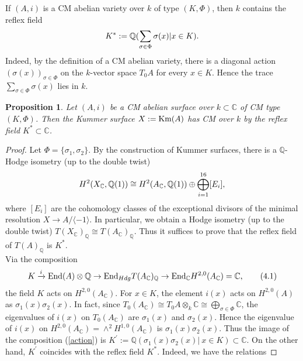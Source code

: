 \documentclass[reqno,a4paper,11pt]{amsart}
\newtheorem{prop}[dfn]{Proposition}
\theoremstyle{definition}
\theoremstyle{definition}
\begin{document}
      If $(A, i)$ is a CM abelian variety over $k$ of type $(K, \Phi)$, then $k$ contains the reflex field 
      \begin{align}\notag K^{\ast}:=\mathbb{Q}(\sum_{\sigma\in \Phi}\sigma(x)| x\in K).
      \end{align}Indeed, by the definition of a CM abelian variety, there is a diagonal action $(\sigma(x))_{\sigma\in \Phi}$ on the $k$-vector space $T_{0}A$ for every $x\in K$. Hence the trace $\sum_{\sigma\in \Phi}\sigma(x)$ lies in $k$.    
      \begin{prop}
          Let $(A, i)$ be a CM abelian surface over $k\subset \mathbb{C}$ of CM type $(K, \Phi)$. Then the Kummer surface $X:={\rm Km}(A)$ has CM over $k$ by the reflex field $K^{\ast}\subset\mathbb{C}$. 
      \end{prop} 
      \begin{proof}Let $\Phi=\{\sigma_{1}, \sigma_{2}\}.$ By the construction of Kummer surfaces, there is a $\mathbb{Q}$-Hodge isometry (up to the double twist)
          \begin{align}
              H^{2}(X_{\mathbb{C}}, \mathbb{Q}(1))\cong H^{2}(A_{\mathbb{C}}, \mathbb{Q}(1))\oplus \bigoplus^{16}_{i=1}[E_{i}], \notag 
          \end{align}
          where $[E_{i}]$ are the cohomology classes of the exceptional divisors of the minimal resolution $X\to A/\langle-1\rangle$.
          In particular, we obtain a Hodge isometry (up to the double twist) $T(X_\mathbb{C})_{\mathbb{Q}}\cong T(A_{\mathbb{C}})_{\mathbb{Q}}$.  Thus it  suffices to prove that the reflex field of $T(A)_{\mathbb{Q}}$ is $K^{\ast}$.
          \\\indent Via the composition
          \begin{align}\label{action}
            K\xrightarrow{i} {\rm End}(A)\otimes \mathbb{Q}\to{\rm End}_{Hdg}T(A_{\mathbb{C}})_{\mathbb{Q}}\to {\rm End}_{\mathbb{C}} H^{2, 0}(A_{\mathbb{C}})=\mathbb{C},  
         \tag{4.1} \end{align}
the field $K$ acts on $H^{2, 0}(A_{\mathbb{C}})$. 
          For $x\in K$, the element  $i(x)$ acts on $H^{2, 0}(A)$ as $\sigma_{1}(x)\sigma_{2}(x)$. In fact, since $T_{0}(A_{\mathbb{C}})\cong T_{0}A\otimes_{k}\mathbb{C}\cong \bigoplus_{\sigma\in \Phi} \mathbb{C}$,  the eigenvalues of $i(x)$ on $T_{0}(A_{\mathbb{C}})$ are  $\sigma_{1}(x)$ and $\sigma_{2}(x)$. Hence the eigenvalue of $i(x)$ on $H^{2, 0}(A_{\mathbb{C}})=\wedge^{2}H^{1, 0}(A_{\mathbb{C}})$ is $\sigma_{1}(x)\sigma_2(x)$. Thus the image of the composition (\ref{action}) is $K^{'}:=\mathbb{Q}(\sigma_{1}(x)\sigma_{2}(x)|~x\in K)\subset \mathbb{C}$. On the other hand, $K^{'}$ coincides with the reflex field $K^{\ast}$. Indeed, we have the relations

\end{proof}
\end{document}
